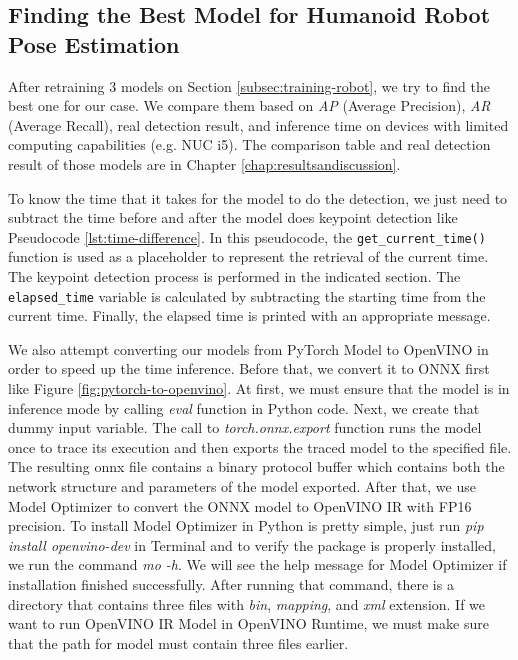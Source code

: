 \subsection{Finding the Best Model for Humanoid Robot Pose Estimation}
\label{subsec:finding-best-model-humanoid-robot}

After retraining 3 models on Section \ref{subsec:training-robot}, we try to find the best one for our case. We compare them based on \emph{AP} (Average Precision), \emph{AR} (Average Recall),
real detection result, and inference time on devices with limited computing capabilities (e.g. NUC i5).
The comparison table and real detection result of those models are in Chapter \ref{chap:resultsandiscussion}.

To know the time that it takes for the model to do the detection, we just need to subtract the time before and after the model does keypoint detection like Pseudocode \ref{lst:time-difference}.
In this pseudocode, the \verb|get_current_time()| function is used as a placeholder to represent the retrieval of the current time. The keypoint detection process is performed in the indicated section.
The \verb|elapsed_time| variable is calculated by subtracting the starting time from the current time. Finally, the elapsed time is printed with an appropriate message.

We also attempt converting our models from PyTorch Model to OpenVINO in order to speed up the time inference. Before that, we convert it to ONNX first like Figure \ref{fig:pytorch-to-openvino}.
At first, we must ensure that the model is in inference mode by calling \emph{eval} function in Python code.
Next, we create that dummy input variable. The call to \emph{torch.onnx.export} function runs the model once to trace its execution and then exports the traced model to the specified file.
The resulting onnx file contains a binary protocol buffer which contains both the network structure and parameters of the model exported.
After that, we use Model Optimizer to convert the ONNX model to OpenVINO IR with FP16 precision. To install Model Optimizer in Python is pretty simple, just run
\emph{pip install openvino-dev} in Terminal and to verify the package is properly installed, we run the command \emph{mo -h}. We will see the help message for Model Optimizer if installation finished successfully.
After running that command, there is a directory that contains three files with \emph{bin}, \emph{mapping}, and \emph{xml} extension.
If we want to run OpenVINO IR Model in OpenVINO Runtime, we must make sure that the path for model must contain three files earlier.

